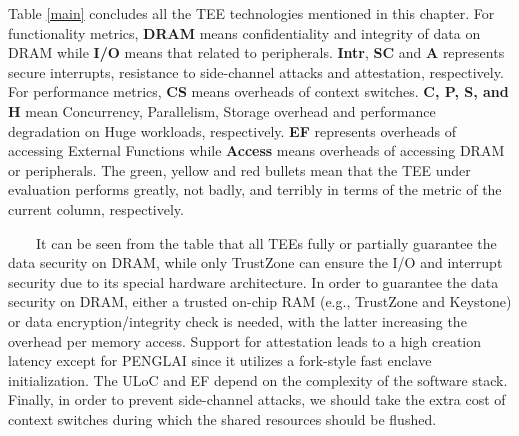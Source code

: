 \documentclass[12pt,twoside]{report}
\begin{document}
Table \ref{main} concludes all the TEE technologies mentioned in this chapter. For functionality metrics, \textbf{DRAM} means confidentiality and integrity of data on DRAM while \textbf{I/O} means that related to peripherals. \textbf{Intr}, \textbf{SC} and \textbf{A} represents secure interrupts, resistance to side-channel attacks and attestation, respectively. For performance metrics, \textbf{CS} means overheads of context switches. \textbf{C, P, S, and H} mean Concurrency, Parallelism, Storage overhead and performance degradation on Huge workloads, respectively. \textbf{EF} represents overheads of accessing External Functions while \textbf{Access} means overheads of accessing DRAM or peripherals. The green, yellow and red bullets mean that the TEE under evaluation performs greatly, not badly, and terribly in terms of the metric of the current column, respectively.

\ \ \ \ It can be seen from the table that all TEEs fully or partially guarantee the data security on DRAM, while only TrustZone can ensure the I/O and interrupt security due to its special hardware architecture. In order to guarantee the data security on DRAM, either a trusted on-chip RAM (e.g., TrustZone and Keystone) or data encryption/integrity check is needed, with the latter increasing the overhead per memory access. Support for attestation leads to a high creation latency except for PENGLAI since it utilizes a fork-style fast enclave initialization. The ULoC and EF depend on the complexity of the software stack. Finally, in order to prevent side-channel attacks, we should take the extra cost of context switches during which the shared resources should be flushed.

\end{document}
